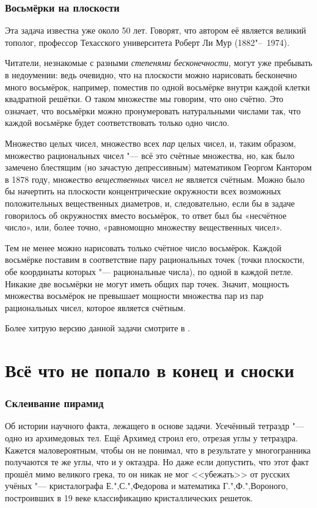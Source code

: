 \documentclass[twoside]{book}
\begin{document}
\subsubsection*{Восьмёрки на плоскости}%

Эта задача известна уже около 50 лет.
Говорят, что автором её является великий тополог, профессор Техасского университета Роберт Ли Мур (1882"--~1974). %

Читатели, незнакомые с разными \emph{степенями бесконечности}, могут уже пребывать в недоумении: ведь очевидно, что на плоскости можно нарисовать бесконечно много восьмёрок, например, поместив по одной восьмёрке внутри каждой клетки квадратной решётки.
О таком множестве мы говорим, что оно счётно. 
Это означает, что восьмёрки можно пронумеровать натуральными числами так, что каждой восьмёрке будет соответствовать только одно число.


Множество целых чисел, множество всех \emph{пар} целых чисел, и, таким образом, множество рациональных чисел "--- всё это счётные множества, но, как было замечено блестящим (но зачастую депрессивным) математиком Георгом Кантором в 1878 году, множество \emph{вещественных} чисел \emph{не} является счётным.
Можно было бы начертить на плоскости концентрические окружности всех возможных положительных вещественных диаметров, и, следовательно, если бы в задаче говорилось об окружностях вместо восьмёрок, то ответ был бы «несчётное число», или, более точно, «равномощно множеству вещественных чисел».

Тем не менее можно нарисовать только счётное число восьмёрок.
Каждой восьмёрке поставим в соответствие пару рациональных точек (точки плоскости, обе координаты которых "--- рациональные числа), по одной в каждой петле.
Никакие две восьмёрки не могут иметь общих пар точек.
Значит, мощность множества восьмёрок не превышает мощности множества пар из пар рациональных чисел, которое является счётным.\heart

Более хитрую версию данной задачи смотрите в .

\section*{Всё что не попало в конец и сноски}

\subsubsection*{Склеивание пирамид}
Об истории научного факта, лежащего в основе задачи. 
Усечённый тетраэдр "--- одно из архимедовых тел. Ещё Архимед строил его, отрезая углы у тетраэдра. 
Кажется маловероятным, чтобы он не понимал, что в результате у многогранника получаются те же углы, что и у октаэдра.
Но даже если допустить, что этот факт прошёл мимо великого грека, то он никак не мог <<убежать>> от русских учёных "--- 
кристалографа Е.",С.",Федорова и математика Г.",Ф.",Вороного, построивших в 19 веке классификацию кристаллических решеток.
\end{document}
